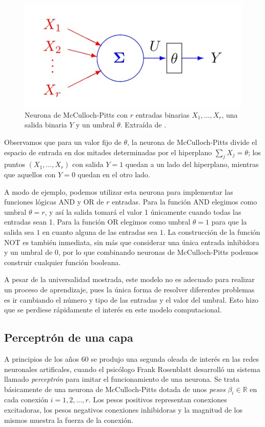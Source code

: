 \documentclass[
  a4paper,
  12pt,
  spanish,
]{scrartcl}
\theoremstyle{teorema-style}
\begin{document}
\begin{figure}[h]
  \centering
  \includegraphics[width=.7\textwidth]{img/mcculloch-pitts}
  \caption{Neurona de McCulloch-Pitts con $r$ entradas binarias $X_1,\dots,X_r$, una salida binaria $Y$ y un umbral $\theta$. Extraída de \parencite{izenman_modern_2008}.}
  \label{fig:mcculloch-pitts}
\end{figure}

Observamos que para un valor fijo de $\theta$, la neurona de McCulloch-Pitts divide el espacio de entrada en dos mitades determinadas por el hiperplano $\sum_j X_j = \theta$; los puntos $(X_1, \dots, X_r)$ con salida $Y=1$ quedan a un lado del hiperplano, mientras que aquellos con $Y=0$ quedan en el otro lado.

A modo de ejemplo, podemos utilizar esta neurona para implementar las funciones lógicas AND y OR de $r$ entradas. Para la función AND elegimos como umbral $\theta = r$, y así la salida tomará el valor 1 únicamente cuando todas las entradas sean 1. Para la función OR elegimos como umbral $\theta = 1$ para que la salida sea $1$ en cuanto alguna de las entradas sea $1$. La construcción de la función NOT es también inmediata, sin más que considerar una única entrada inhibidora y un umbral de $0$, por lo que combinando neuronas de McCulloch-Pitts podemos construir cualquier función booleana.

A pesar de la universalidad mostrada, este modelo no es adecuado para realizar un proceso de aprendizaje, pues la única forma de resolver diferentes problemas es ir cambiando el número y tipo de las entradas y el valor del umbral. Esto hizo que se perdiese rápidamente el interés en este modelo computacional.

\subsection{Perceptrón de una capa}

A principios de los años 60 se produjo una segunda oleada de interés en las redes neuronales artificales, cuando el psicólogo Frank Rosenblatt desarrolló un sistema llamado \textit{perceptrón} \parencite{rosenblatt_perceptron_1958} para imitar el funcionamiento de una neurona. Se trata básicamente de una neurona de McCulloch-Pitts dotada de unos \textit{pesos} $\beta_i \in \mathbb{R}$ en cada conexión $i=1,2,\dots, r$. Los pesos positivos representan conexiones excitadoras, los pesos negativos conexiones inhibidoras y la magnitud de los mismos muestra la fuerza de la conexión.
\end{document}

